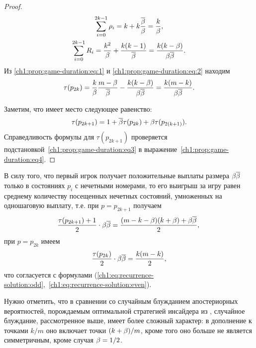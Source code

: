 {\begin{proof}
\begin{equation}
    \begin{gathered}
      \sum_{i=0}^{2k-1} \rho_i = k + k \frac{\overline{\beta}}{\beta} = \frac{k}{\beta},\\
      \sum_{i=0}^{2k-1} R_i = \frac{k^2}{\beta} + \frac{k(k-1)}{\overline{\beta}} = \frac{k(k-\beta)}{\beta\overline{\beta}}.
    \end{gathered}
  \end{equation}
  Из \eqref{ch1:prop:game-duration:eq:1} и \eqref{ch1:prop:game-duration:eq:2} находим
  \begin{gather}
    \label{ch1:prop:game-duration:eq3}
    \tau(p_{2k}) =
    \frac{k}{\beta} \frac{m-\beta}{\overline{\beta}} - \frac{k(k-\beta)}{\beta\overline{\beta}} =
    \frac{k(m-k)}{\beta\overline{\beta}}.
  \end{gather}

  Заметим, что имеет место следующее равенство:
  \begin{equation}
    \label{ch1:prop:game-duration:eq4}
    \tau(p_{2k+1}) = 1 + \overline{\beta} \tau(p_{2k}) + \beta \tau(p_{2(k+1)}).
  \end{equation}
  Справедливость формулы для $\tau(p_{2k+1})$ проверяется
  подстановкой~\eqref{ch1:prop:game-duration:eq3} в
  выражение~\eqref{ch1:prop:game-duration:eq4}.
\end{proof}

В силу того, что первый игрок получает положительные выплаты размера $\beta\overline{\beta}$
только в состояниях $p_i$ с нечетными номерами, то его выигрыш за игру равен
среднему количеству посещенных нечетных состояний, умноженных на одношаговую
выплату, т.е. при $p = p_{2k+1}$ получаем
\begin{equation*}
  \frac{\tau(p_{2k+1}) + 1}{2} \cdot \beta\overline{\beta} = \frac{(m-k-\beta)(k+\beta) + \beta\overline{\beta}}{2},\\
\end{equation*}
при $p = p_{2k}$ имеем
\begin{equation*}
  \frac{\tau(p_{2k})}{2} \cdot \beta\overline{\beta} = \frac{k(m-k)}{2},
\end{equation*}
что согласуется с формулами
(\ref{ch1:eq:recurrence-solution:odd},~\ref{ch1:eq:recurrence-solution:even}).

Нужно отметить, что в сравнении со случайным блужданием апостериорных
вероятностей, порождаемым оптимальной стратегией инсайдера из \cite{domansky07},
случайное блуждание, рассмотренное выше, имеет более сложный характер: в
дополнение к точками $k/m$ оно включает точки $(k+\beta)/m$, кроме того оно больше
не является симметричным, кроме случая $\beta = 1/2$.

}
